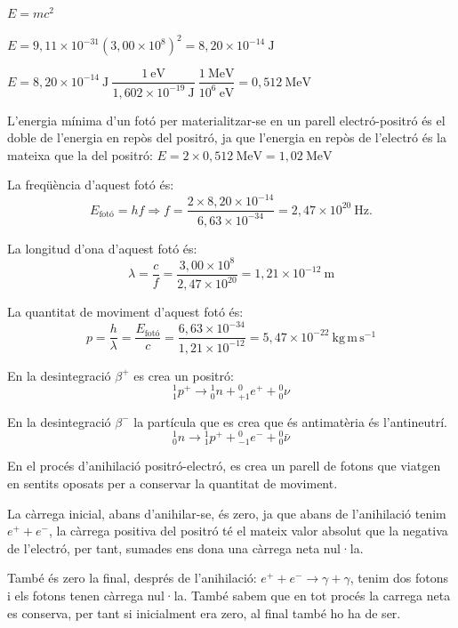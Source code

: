 \begin{solapartat}
 $E = mc^2$

 $E = 9,11\times 10^{-31}(3,00\times 10^8)^2 = 8,20\times 10^{-14}\ \mathrm{J}$

 $E = 8,20\times 10^{-14}\ \mathrm{J}\ \dfrac{1\ \mathrm{eV}}{1,602\times 10^{-19}\ \mathrm{J}}\ \dfrac{1\ \mathrm{MeV}}{10^6\ \mathrm{eV}} = 0,512\ \mathrm{MeV}$

 L'energia mínima d'un fotó per materialitzar-se en un parell electró-positró és el doble de l'energia en repòs del positró, ja que l'energia en repòs de l'electró és la mateixa que la del positró: $E = 2\times 0,512\ \mathrm{MeV} = 1,02\ \mathrm{MeV}$

 La freqüència d'aquest fotó és:
\[ E_\text{fotó} = hf \Rightarrow f = \frac{2\times 8,20\times 10^{-14}}{6,63\times 10^{-34}} = 2,47\times 10^{20}\ \mathrm{Hz}. \]

 La longitud d'ona d'aquest fotó és:
\[ \lambda = \frac{c}{f} = \frac{3,00\times 10^8}{2,47\times 10^{20}} = 1,21\times 10^{-12}\ \mathrm{m} \]

 La quantitat de moviment d'aquest fotó és:
\[ p = \frac{h}{\lambda} = \frac{E_\text{fotó}}{c} = \frac{6,63\times 10^{-34}}{1,21\times 10^{-12}} = 5,47\times 10^{-22}\ \mathrm{kg\,m\,s^{-1}} \]
\end{solapartat}

\begin{solapartat}
 En la desintegració $\beta^+$ es crea un positró:
\[ {}^{1}_{1}p^+ \to {}^{1}_{0}n + {}^{0}_{+1}e^+ + {}^{0}_{0}\nu \]

 En la desintegració $\beta^-$ la partícula que es crea que és antimatèria és l'antineutrí.
\[ {}^{1}_{0}n \to {}^{1}_{1}p^+ + {}^{0}_{-1}e^- + {}^{0}_{0}\bar{\nu} \]

 En el procés d'anihilació positró-electró, es crea un parell de fotons que viatgen en sentits oposats per a conservar la quantitat de moviment.

 La càrrega inicial, abans d'anihilar-se, és zero, ja que abans de l'anihilació tenim $e^+ + e^-$, la càrrega positiva del positró té el mateix valor absolut que la negativa de l'electró, per tant, sumades ens dona una càrrega neta nul·la.

 També és zero la final, després de l'anihilació: $e^+ + e^- \longrightarrow \gamma + \gamma$, tenim dos fotons i els fotons tenen càrrega nul·la. També sabem que en tot procés la carrega neta es conserva, per tant si inicialment era zero, al final també ho ha de ser.
\end{solapartat}
